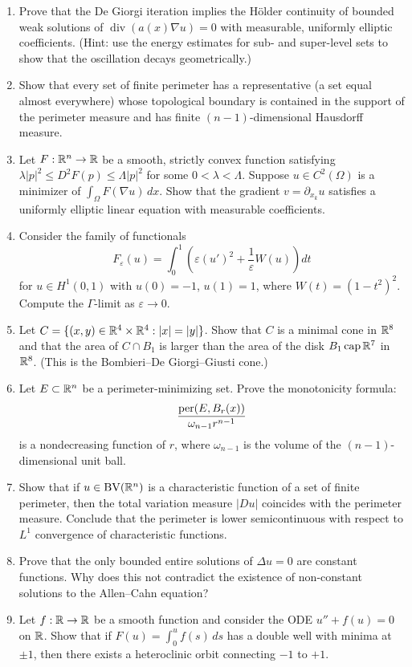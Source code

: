\begin{enumerate}
    \item [I] Prove that the De Giorgi iteration implies the H\"older continuity of bounded weak solutions of \(\operatorname{div}(a(x)\nabla u) = 0\) with measurable, uniformly elliptic coefficients. (Hint: use the energy estimates for sub- and super-level sets to show that the oscillation decays geometrically.)
    \item [I] Show that every set of finite perimeter has a representative (a set equal almost everywhere) whose topological boundary is contained in the support of the perimeter measure and has finite \((n-1)\)-dimensional Hausdorff measure.
    \item [I] Let \(F: \mathbb{R}^n \to \mathbb{R}\) be a smooth, strictly convex function satisfying \(\lambda |p|^2 \leq D^2F(p) \leq \Lambda |p|^2\) for some \(0 < \lambda < \Lambda\). Suppose \(u \in C^2(\Omega)\) is a minimizer of \(\int_\Omega F(\nabla u)\,dx\). Show that the gradient \(v = \partial_{x_k}u\) satisfies a uniformly elliptic linear equation with measurable coefficients.
    \item [I] Consider the family of functionals
    \[
    F_\varepsilon(u) = \int_0^1 \left( \varepsilon (u')^2 + \frac{1}{\varepsilon} W(u) \right) dt
    \]
    for \(u \in H^1(0,1)\) with \(u(0) = -1\), \(u(1) = 1\), where \(W(t) = (1-t^2)^2\). Compute the \(\Gamma\)-limit as \(\varepsilon \to 0\).
    \item [A] Let \(C = \{(x,y) \in \mathbb{R}^4 \times \mathbb{R}^4 : |x| = |y|\}\). Show that \(C\) is a minimal cone in \(\mathbb{R}^8\) and that the area of \(C \cap B_1\) is larger than the area of the disk \(B_1 \operatorname{\mathrm{cap}} \mathbb{R}^7\) in \(\mathbb{R}^8\). (This is the Bombieri--De Giorgi--Giusti cone.)
    \item [I] Let \(E \subset \mathbb{R}^n\) be a perimeter-minimizing set. Prove the monotonicity formula:
    \[
    \frac{\operatorname{per}(E, B_r(x))}{\omega_{n-1} r^{n-1}}
    \]
    is a nondecreasing function of \(r\), where \(\omega_{n-1}\) is the volume of the \((n-1)\)-dimensional unit ball.
    \item [I] Show that if \(u \in \operatorname{BV}(\mathbb{R}^n)\) is a characteristic function of a set of finite perimeter, then the total variation measure \(|Du|\) coincides with the perimeter measure. Conclude that the perimeter is lower semicontinuous with respect to \(L^1\) convergence of characteristic functions.
    \item [B] Prove that the only bounded entire solutions of \(\Delta u = 0\) are constant functions. Why does this not contradict the existence of non-constant solutions to the Allen--Cahn equation?
    \item [I] Let \(f: \mathbb{R} \to \mathbb{R}\) be a smooth function and consider the ODE \(u'' + f(u) = 0\) on \(\mathbb{R}\). Show that if \(F(u) = \int_0^u f(s)\,ds\) has a double well with minima at \(\pm 1\), then there exists a heteroclinic orbit connecting \(-1\) to \(+1\).
\end{enumerate}


